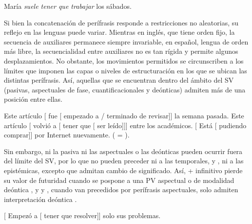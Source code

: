 \begin{exe}
  \ex
    \begin{xlist}
      \ex María \textit{suele tener que trabajar} los sábados.
    \end{xlist}
\end{exe}

\begin{recuadro}
Si bien la concatenación de perífrasis responde a restricciones no aleatorias, su
reflejo en las lenguas puede variar. Mientras en inglés, que tiene orden fijo, la
secuencia de auxiliares permanece siempre invariable, en español, lengua de orden
más libre, la secuencialidad entre auxiliares no es tan rígida y permite algunos
desplazamientos. No obstante, los movimientos permitidos se circunscriben a los
límites que imponen las capas o niveles de estructuración en los que se ubican
las distintas perífrasis. Así, aquellas que se encuentran dentro del ámbito del
SV (pasivas, aspectuales de fase, cuantificacionales y deónticas) admiten más de
una posición entre ellas.

\begin{exe}
  \ex Este artículo [ fue [ empezado a / terminado de
      revisar]] la semana pasada.
  \ex Este artículo [ volvió a [ tener que [ ser
      leído]]] entre los académicos.
  \ex {}[ Está [ pudiendo comprar]] por Internet
      nuevamente. ( = ).
\end{exe}

Sin embargo, ni la pasiva ni las aspectuales o las deónticas pueden ocurrir fuera
del límite del SV, por lo que no pueden preceder ni a las temporales,
 y , ni a las epistémicas, excepto que
admitan cambio de significado. Así,  + infinitivo pierde su valor de
futuridad cuando se pospone a una PV aspectual o de modalidad deóntica
, y  y , cuando van
precedidos por perífrasis aspectuales, solo admiten interpretación deóntica
.

\begin{exe}
  \ex\label{ex:11-desp3} {}[ Empezó a [ tener que
      resolver]] solo sus problemas.
\end{exe}


\end{recuadro}
